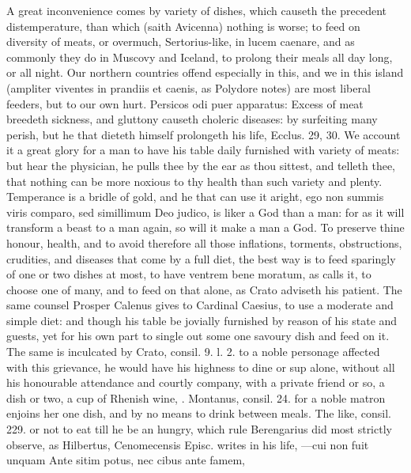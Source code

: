 {A great inconvenience comes by variety of dishes, which causeth the
precedent distemperature, than which (saith Avicenna) nothing is
worse; to feed on diversity of meats, or overmuch, Sertorius-like, in
lucem caenare, and as commonly they do in Muscovy and Iceland, to
prolong their meals all day long, or all night. Our northern countries
offend especially in this, and we in this island (ampliter viventes in
prandiis et caenis, as Polydore notes) are most liberal feeders,
but to our own hurt. Persicos odi puer apparatus: Excess of meat
breedeth sickness, and gluttony causeth choleric diseases: by
surfeiting many perish, but he that dieteth himself prolongeth his
life, Ecclus.  29, 30. We account it a great glory for a man to
have his table daily furnished with variety of meats: but hear the
physician, he pulls thee by the ear as thou sittest, and telleth thee,
that nothing can be more noxious to thy health than such variety
and plenty. Temperance is a bridle of gold, and he that can use it
aright, ego non summis viris comparo, sed simillimum Deo judico,
is liker a God than a man: for as it will transform a beast to a man
again, so will it make a man a God. To preserve thine honour, health,
and to avoid therefore all those inflations, torments, obstructions,
crudities, and diseases that come by a full diet, the best way is to
feed sparingly of one or two dishes at most, to have ventrem bene
moratum, as \Seneca calls it, to choose one of many, and to feed
on that alone, as Crato adviseth his patient. The same counsel
Prosper Calenus gives to Cardinal Caesius, to use a moderate and
simple diet: and though his table be jovially furnished by reason of
his state and guests, yet for his own part to single out some one
savoury dish and feed on it. The same is inculcated by Crato,
consil. 9. l. 2. to a noble personage affected with this grievance, he
would have his highness to dine or sup alone, without all his
honourable attendance and courtly company, with a private friend or so,
a dish or two, a cup of Rhenish wine, \etc{}. Montanus, consil. 24.
for a noble matron enjoins her one dish, and by no means to drink
between meals. The like, consil. 229. or not to eat till he be an
hungry, which rule Berengarius did most strictly observe, as Hilbertus,
Cenomecensis Episc. writes in his life,
---cui non fuit unquam
Ante sitim potus, nec cibus ante famem,

}
